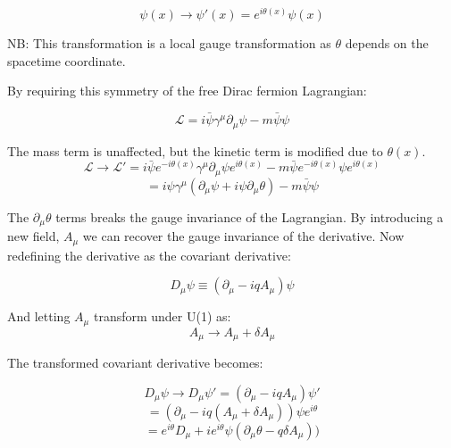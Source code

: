 \begin{equation}
\psi(x) \rightarrow \psi'(x) = e^{i\theta(x)}\psi(x)
\end{equation}

NB: This transformation is a local gauge transformation as $\theta$ depends on the spacetime coordinate.

By requiring this symmetry of the free Dirac fermion Lagrangian:

\begin{equation}
\mathcal{L} = i\bar{\psi}\gamma^{\mu}\partial_{\mu}\psi - m \bar{\psi}\psi
\end{equation}

The mass term is unaffected, but the kinetic term is modified due to $\theta(x)$.
\begin{equation}
\mathcal{L} \rightarrow \mathcal{L}' = i\bar{\psi} e^{-i\theta(x)}\gamma^{\mu}\partial_{\mu}\psi e^{i\theta(x)} - m \bar{\psi}e^{-i\theta(x)}\psi e^{i\theta(x)}
\end{equation}
\begin{equation}
= i\psi \gamma^{\mu}(\partial_{ \mu }\psi + i \psi \partial_{ \mu } \theta)- m \bar{ \psi } \psi
\end{equation}

The $\partial_{\mu}\theta$ terms breaks the gauge invariance of the Lagrangian. By introducing a new field, $A_{\mu}$ we can recover the gauge invariance of the derivative. Now redefining the derivative as the covariant derivative:

\begin{equation}
D_{\mu}\psi \equiv (\partial_{\mu} - iqA_{\mu})\psi
\end{equation}

And letting $A_{\mu}$ transform under U(1) as:
\begin{equation}
A_{\mu} \rightarrow A_{\mu} +  \delta A_{\mu} 
\end{equation}

The transformed covariant derivative becomes:

\begin{equation}
D_{\mu}\psi \rightarrow D_{\mu}\psi' =  (\partial_{\mu} - iq A_{\mu})\psi'
\end{equation}
\begin{equation}
=  (\partial_{\mu} - iq(A_{\mu} +  \delta A_{\mu} ))\psi e^{i\theta}
\end{equation}
\begin{equation}
=  e^{i\theta}D_{\mu}+ie^{i\theta}\psi(\partial_{\mu}\theta - q\delta A_{\mu}))
 \end{equation}


